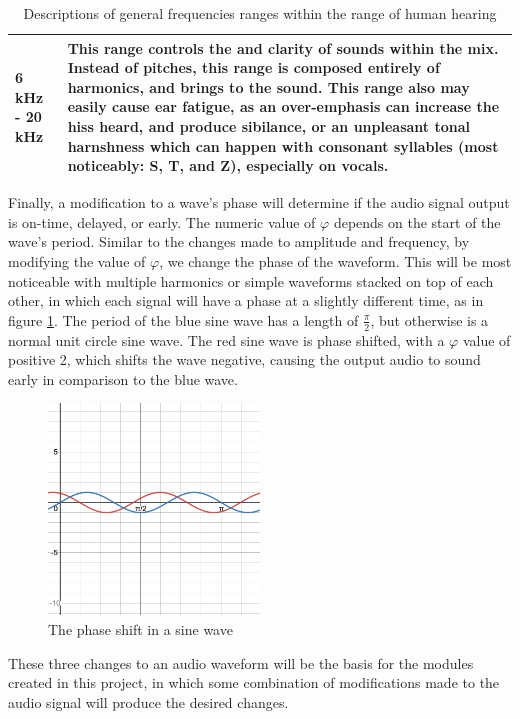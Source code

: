 \begin{table}
\begin{tabular}{|p{20em} | p{25em}|}
		\hline
		6 kHz - 20 kHz & This range controls the \say{brilliance} and clarity of sounds within the mix. Instead of pitches, this range is composed entirely of harmonics, and brings \say{sparkle} to the sound. This range also may easily cause ear fatigue, as an over-emphasis can increase the hiss heard, and produce sibilance, or an unpleasant tonal harnshness which can happen with consonant syllables (most noticeably: S, T, and Z), especially on vocals. \\
		\hline
	\end{tabular}
\caption[A description of the human hearing range]{Descriptions of general frequencies ranges within the range of human hearing}
\label{tbl:frequency-table-of-human-hearing-general}\cite{Suits_1998}\cite{Zjalic_2021}
\end{table}

Finally, a modification to a wave's phase will determine if the audio signal output is on-time, delayed, or early. The numeric value of $\varphi$ depends on the start of the wave's period. Similar to the changes made to amplitude and frequency, by modifying the value of $\varphi$, we change the phase of the waveform. This will be most noticeable with multiple harmonics or simple waveforms stacked on top of each other, in which each signal will have a phase at a slightly different time, as in figure \ref{fig:sine-wave-phase-shift}. The period of the blue sine wave has a length of $\frac{\pi}{2}$, but otherwise is a normal unit circle sine wave. The red sine wave is phase shifted, with a $\varphi$ value of positive 2, which shifts the wave negative, causing the output audio to sound early in comparison to the blue wave. 

\begin{figure}
	\centering
	\includegraphics[width=0.5\textwidth]{figures/sine-wave-phase-shift.png}
	\caption{The phase shift in a sine wave}
	\label{fig:sine-wave-phase-shift}
\end{figure}

These three changes to an audio waveform will be the basis for the modules created in this project, in which some combination of modifications made to the audio signal will produce the desired changes. 